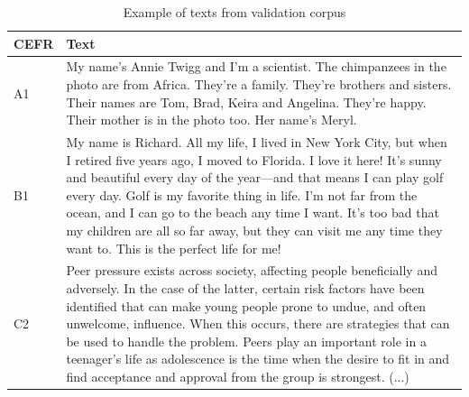 \documentclass[11pt,a4paper]{article}
\begin{document}
\begin{table}
  \centering
  \begin{tabular}{l|p{}}
    \toprule
    CEFR & Text\\
    \midrule
    A1 & My name's Annie Twigg and I'm a scientist. The chimpanzees in the photo are
    from Africa. They're a family. They're brothers and sisters. Their names
    are Tom, Brad, Keira and Angelina. They're happy. Their mother is in the
    photo too. Her name’s Meryl.\\
    \midrule
    B1 & My name is Richard. All my life, I lived in New York City, but when I
    retired five years ago, I moved to Florida. I love it here! It’s sunny and
    beautiful every day of the year—and that means I can play golf every day.
    Golf is my favorite thing in life. I'm not far from the ocean, and I can go
    to the beach any time I want. It’s too bad that my children are all so far
    away, but they can visit me any time they want to. This is the perfect life
    for me!\\
    \midrule
    C2 & Peer pressure exists across society, affecting people beneficially and adversely.
    In the case of the latter, certain risk factors have been identified that can make
    young people prone to undue, and often unwelcome, influence. When this occurs,
    there are strategies that can be used to handle the problem.
    Peers play an important role in a teenager's life as adolescence is the time
    when the desire to fit in and find acceptance and approval from the group is
    strongest. (...)\\
    \bottomrule
  \end{tabular}
  \caption{Example of texts from validation corpus}
  \label{tab:validation-examples}
\end{table}
\end{document}
